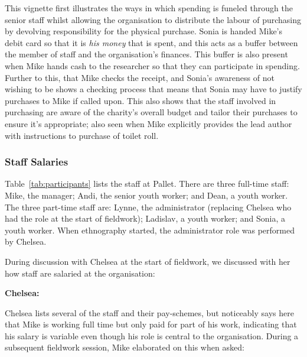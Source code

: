 This vignette first illustrates the ways in which spending is funeled through the senior staff whilst allowing the organisation to distribute the labour of purchasing by devolving responsibility for the physical purchase. Sonia is handed Mike's debit card so that it is \textit{his money} that is spent, and this acts as a buffer between the member of staff and the organisation's finances. This buffer is also present when Mike hands cash to the researcher so that they can participate in spending. Further to this, that Mike checks the receipt, and Sonia's awareness of not wishing to be  shows a checking process that means that Sonia may have to justify purchases to Mike if called upon. This also shows that the staff involved in purchasing are aware of the charity's overall budget and tailor their purchases to ensure it's appropriate; also seen when Mike explicitly provides the lead author with instructions to purchase  of toilet roll.

\subsubsection{Staff Salaries}
Table~\ref{tab:participants} lists the staff at Pallet. There are three full-time staff: Mike, the manager; Andi, the senior youth worker; and Dean, a youth worker. The three part-time staff are: Lynne, the administrator (replacing Chelsea who had the role at the start of fieldwork); Ladislav, a youth worker; and Sonia, a youth worker. When ethnography started, the administrator role was performed by Chelsea.

During discussion with Chelsea at the start of fieldwork, we discussed with her how staff are salaried at the organisation:

\textbf{Chelsea:} 

Chelsea lists several of the staff and their pay-schemes, but noticeably says here that Mike is working full time but only paid for part of his work, indicating that his salary is variable even though his role is central to the organisation. During a subsequent fieldwork session, Mike elaborated on this when asked:


